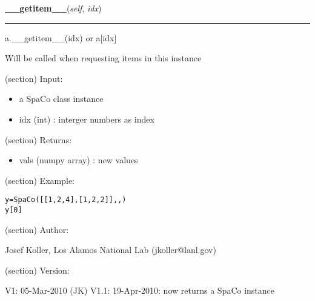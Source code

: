 \hspace{.8\funcindent}\begin{boxedminipage}{\funcwidth}

    \raggedright \textbf{\_\_getitem\_\_}(\textit{self}, \textit{idx})

    \vspace{-1.5ex}

    \rule{\textwidth}{0.5\fboxrule}
\setlength{\parskip}{2ex}
    a.\_\_getitem\_\_(idx) or a[idx]

    Will be called when requesting items in this instance

    (section) Input:

      \begin{itemize}
      \setlength{\parskip}{0.6ex}
        \item a SpaCo class instance

        \item idx (int) : interger numbers as index

      \end{itemize}

    (section) Returns:

      \begin{itemize}
      \setlength{\parskip}{0.6ex}
        \item vals (numpy array) : new values

      \end{itemize}

    (section) Example:

\begin{alltt}
\pysrcprompt{{\textgreater}{\textgreater}{\textgreater} }y = SpaCo([[1,2,4],[1,2,2]], , )
\pysrcprompt{{\textgreater}{\textgreater}{\textgreater} }y[0] 
\end{alltt}
    (section) Author:

      Josef Koller, Los Alamos National Lab (jkoller@lanl.gov)

    (section) Version:

      V1: 05-Mar-2010 (JK) V1.1: 19-Apr-2010: now returns a SpaCo instance

\setlength{\parskip}{1ex}
    \end{boxedminipage}

    \label{spacepy:spacetime:SpaCo:__setitem__}

